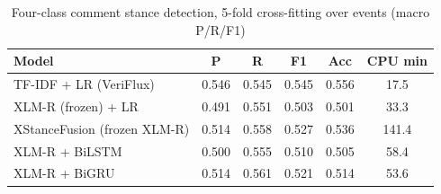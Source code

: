 \begin{table}[t]
\centering
\caption{Four-class comment stance detection, 5-fold cross-fitting over events (macro P/R/F1)}
\label{tab:stance}
\footnotesize
\begin{tabular}{lccccc}
\toprule
Model & P & R & F1 & Acc & CPU min\\
\midrule
TF-IDF + LR (VeriFlux) & 0.546 & 0.545 & 0.545 & 0.556 & 17.5\\
XLM-R (frozen) + LR & 0.491 & 0.551 & 0.503 & 0.501 & 33.3\\
XStanceFusion (frozen XLM-R) & 0.514 & 0.558 & 0.527 & 0.536 & 141.4\\
XLM-R + BiLSTM & 0.500 & 0.555 & 0.510 & 0.505 & 58.4\\
XLM-R + BiGRU & 0.514 & 0.561 & 0.521 & 0.514 & 53.6\\
\bottomrule
\end{tabular}
\end{table}

